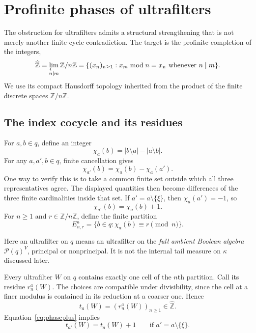 \documentclass[11pt,letterpaper]{article}
\theoremstyle{definition}
\numberwithin{equation}{section}
\newcommand{\ZZ}{\mathbb Z}
\newcommand{\zhat}{\widehat{\mathbb Z}}
\newcommand{\powerset}{\mathcal P}
\begin{document}
\section{Profinite phases of ultrafilters}\label{sec:phases}

The obstruction for ultrafilters admits a structural strengthening that
is not merely another finite-cycle contradiction. The target is the
profinite completion of the integers,
\[
 \zhat=\varprojlim_{n\mid m}\ZZ/n\ZZ
 =\{(x_n)_{n\ge1}: x_m\bmod n=x_n\text{ whenever }n\mid m\}.
\]
We use its compact Hausdorff topology inherited from the product of the
finite discrete spaces $\ZZ/n\ZZ$.

\subsection{The index cocycle and its residues}

For $a,b\in q$, define an integer
\[
 \chi_a(b)=|b\setminus a|-|a\setminus b|.
\]
For any $a,a',b\in q$, finite cancellation gives
\begin{equation}\label{eq:cocycle}
 \chi_{a'}(b)=\chi_a(b)-\chi_a(a').
\end{equation}
One way to verify this is to take a common finite set outside which all
three representatives agree. The displayed quantities then become
differences of the three finite cardinalities inside that set.
If $a'=a\setminus\{\xi\}$, then $\chi_a(a')=-1$, so
\begin{equation}\label{eq:phaseplus}
 \chi_{a'}(b)=\chi_a(b)+1.
\end{equation}
For $n\ge1$ and $r\in\ZZ/n\ZZ$, define the finite partition
\[
 E^a_{n,r}=\{b\in q:\chi_a(b)\equiv r\pmod n\}.
\]

Here an ultrafilter on $q$ means an ultrafilter on the \emph{full ambient
Boolean algebra} $\powerset(q)^V$, principal or nonprincipal. It is not
the internal tail measure on $\kappa$ discussed later.

Every ultrafilter $W$ on $q$ contains exactly one cell of the $n$th
partition. Call its residue $r_n^a(W)$. The choices are compatible under
divisibility, since the cell at a finer modulus is contained in its
reduction at a coarser one. Hence
\[
 t_a(W)=(r_n^a(W))_{n\ge1}\in\zhat.
\]
Equation~\eqref{eq:phaseplus} implies
\begin{equation}\label{eq:phase-shift}
 t_{a'}(W)=t_a(W)+1\qquad\text{if }a'=a\setminus\{\xi\}.
\end{equation}
\end{document}
